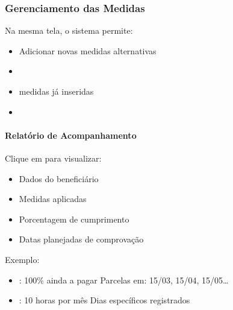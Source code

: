 \documentclass[letterpaper,10pt,brazil]{sphinxmanual}
\begin{document}
\subsubsection{Gerenciamento das Medidas}
\label{\detokenize{projud_54_cadastromedidasalternativas:gerenciamento-das-medidas}}
\sphinxAtStartPar
Na mesma tela, o sistema permite:
\begin{itemize}
\item {} 
\sphinxAtStartPar
Adicionar novas medidas alternativas

\item {} 
\sphinxAtStartPar
{}

\item {} 
\sphinxAtStartPar
{} medidas já inseridas

\item {} 
\sphinxAtStartPar
{}

\end{itemize}


\paragraph{Relatório de Acompanhamento}
\label{\detokenize{projud_54_cadastromedidasalternativas:relatorio-de-acompanhamento}}
\sphinxAtStartPar
Clique em  para visualizar:
\begin{itemize}
\item {} 
\sphinxAtStartPar
Dados do beneficiário

\item {} 
\sphinxAtStartPar
Medidas aplicadas

\item {} 
\sphinxAtStartPar
Porcentagem de cumprimento

\item {} 
\sphinxAtStartPar
Datas planejadas de comprovação

\end{itemize}

\sphinxAtStartPar
Exemplo:
\begin{itemize}
\item {} 
\sphinxAtStartPar
{}:
\sphinxhyphen{} 100\% ainda a pagar
\sphinxhyphen{} Parcelas em: 15/03, 15/04, 15/05…

\item {} 
\sphinxAtStartPar
{}:
\sphinxhyphen{} 10 horas por mês
\sphinxhyphen{} Dias específicos registrados

\end{itemize}
\end{document}
